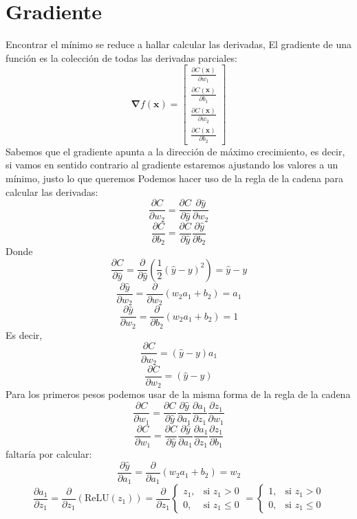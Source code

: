 \documentclass{article}
\begin{document}
	\section{Gradiente}
	Encontrar el mínimo se reduce a hallar calcular las derivadas, El gradiente de una función es la colección de todas las derivadas parciales:
	\[
	\mathbf{\nabla} f(\mathbf{x}) =
	\begin{bmatrix}
		\frac{\partial C(\mathbf{x})}{\partial w_1} \\
		\frac{\partial C(\mathbf{x})}{\partial b_1} \\
		\frac{\partial C(\mathbf{x})}{\partial w_2} \\
		\frac{\partial C(\mathbf{x})}{\partial b_2}
	\end{bmatrix}
	\]
	Sabemos que el gradiente apunta a la dirección de máximo crecimiento, es decir, si vamos en sentido contrario al gradiente estaremos ajustando los valores a un mínimo, justo lo que queremos
	Podemos hacer uso de la regla de la cadena para calcular las derivadas:
	\[
	\frac{\partial C}{\partial w_2} = \frac{\partial C}{\partial \hat{y}}\frac{\partial \hat{y}}{\partial w_2}
	\]
	\[
	\frac{\partial C}{\partial b_2} = \frac{\partial C}{\partial \hat{y}}\frac{\partial \hat{y}}{\partial b_2}
	\]
	Donde
	\[
	\frac{\partial C}{\partial \hat{y}} = \frac{\partial }{\partial \hat{y}} (\frac{1}{2}(\hat{y} - y )^2) = \hat{y} - y 
	\]
	\[
	\frac{\partial \hat{y}}{\partial w_2} = \frac{\partial}{\partial w_2} (w_2a_1 + b_2) = a_1
	\]
	\[
	\frac{\partial \hat{y}}{\partial w_2} = \frac{\partial}{\partial b_2} (w_2a_1 + b_2) = 1
	\]
	Es decir,
	\[
	\frac{\partial C}{\partial w_2} = (\hat{y} - y)a_1
	\]
	\[
	\frac{\partial C}{\partial w_2} = (\hat{y} - y)
	\]
	Para los primeros pesos podemos usar de la misma forma de la regla de la cadena
	\[
	\frac{\partial C}{\partial w_1} = \frac{\partial C}{\partial \hat{y}} \frac{\partial \hat{y}}{\partial a_1} \frac{\partial a_1}{\partial z_1} \frac{\partial z_1}{\partial w_1}
	\]
	\[
	\frac{\partial C}{\partial w_1} = \frac{\partial C}{\partial \hat{y}} \frac{\partial \hat{y}}{\partial a_1} \frac{\partial a_1}{\partial z_1} \frac{\partial z_1}{\partial b_1}
	\]
	faltaría por calcular:
	\[
	\frac{\partial \hat{y}}{\partial a_1} = \frac{\partial}{\partial a_1}(w_2a_1 + b_2) = w_2
	\]
	\[
	\frac{\partial a_1}{\partial z_1} =  \frac{\partial}{\partial z_1}(\text{ReLU}(z_1)) =
	\frac{\partial}{\partial z_1}
	\begin{cases}
		z_1, & \text{si } z_1 > 0 \\
		0, & \text{si } z_1 \leq 0
	\end{cases}
	=  
	\begin{cases}
		1, & \text{si } z_1 > 0 \\
		0, & \text{si } z_1 \leq 0
	\end{cases} 
	\]
\end{document}
